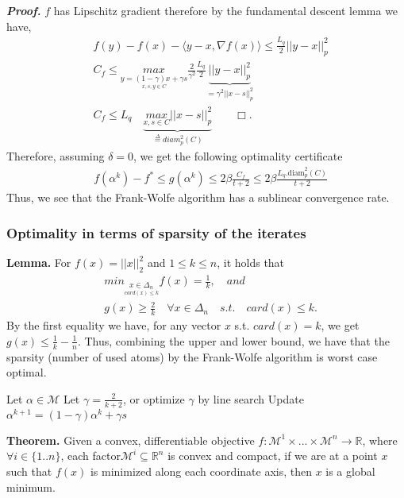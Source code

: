 \textbf{\textit{Proof.}} $f$ has Lipschitz gradient therefore by the fundamental descent lemma we have,
\begin{equation*}
\begin{aligned}
      &f(y)- f(x)- \langle y- x, \nabla f(x)\rangle \leq \frac{L_{q}}{2}||y- x||_{p}^{2}\\
      &C_{f} \leq \underset{\underset{x,s,y\in C}{y=(1-\gamma)x+\gamma s}}{max}\frac{2}{\gamma^{2}}\frac{L_{q}}{2}\underbrace{||y- x||_{p}^{2}}_{=\gamma^{2}||x- s||_{p}^{2}}\\
      &C_{f} \leq L_{q}\quad\underbrace{\underset{x,s\in C}{max}||x- s||_{p}^{2}}_{\overset{\Delta}{=}\textit{diam}_{p}^{2}(C)}\quad\quad\Box.
\end{aligned}
\end{equation*}
Therefore, assuming $\delta=0$, we get the following optimality certificate
\begin{equation*}
\begin{aligned}
      &f(\alpha^{k})- f^{*}\leq  g(\alpha^{k})\leq 2\beta\frac{C_{f}}{t+2}\leq 2\beta\frac{L_{q}.\text{diam}_{p}^{2}(C)}{t+2}
\end{aligned}
\end{equation*}
Thus, we see that the Frank-Wolfe algorithm has a sublinear convergence rate.
\subsubsection{Optimality in terms of sparsity of the iterates}
\textbf{Lemma.} For $f(x)= ||x||_{2}^{2}$ and $1\leq k\leq n$, it holds that
\begin{equation*}
\begin{aligned}
      &\textit{min}_{\underset{card(x)\leq
      k}{x\in\Delta_{n}}}f(x)= \frac{1}{k},\quad\textit{and}\\
      &g(x)\geq \frac{2}{k}\quad\forall x\in\Delta_{n}\quad\textit{s.t.}\quad card(x)\leq k.
\end{aligned}
\end{equation*}
By the first equality we have, for any vector $x$ s.t. $card(x)= k$, we get $g(x)\leq \frac{1}{k}- \frac{1}{n}$.
Thus, combining the upper and lower bound, we have that the sparsity (number of used atoms) by the Frank-Wolfe algorithm is worst case optimal.
\begin{algorithmic}
   \STATE Let $\alpha\in\mathcal{M}$
   \STATE Let $\gamma = \frac{2}{k+2}$, or optimize $\gamma$ by line search
   \STATE Update $\alpha^{k+1}= (1-\gamma)\alpha^{k}+ \gamma s$
   \ENDFOR
\end{algorithmic}
\textbf{Theorem.} Given a convex, differentiable objective
$f:\mathcal{M}^{1}\times...\times\mathcal{M}^{n}\to\mathbb{R}$, where $\forall
i\in\{1..n\}$, each factor\quad $\mathcal{M}^{i}\subseteq\mathbb{R}^{n}$ is
convex and compact, if we are at a point $x$ such that $f(x)$ is minimized along
each coordinate axis, then $x$ is a global minimum.\\

